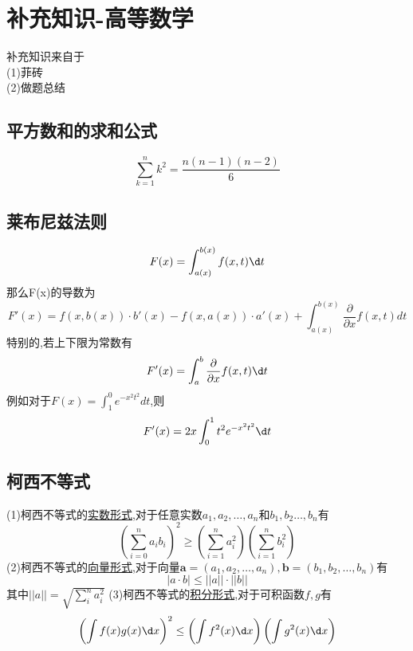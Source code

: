 \documentclass[12pt, a4paper, oneside, UTF8]{ctexbook}
\begin{document}

\else
\fi
\chapter {补充知识-高等数学}

\begin{tcolorbox}
    补充知识来自于 \\
    (1)菲砖 \\
    (2)做题总结
\end{tcolorbox}
\section{平方数和的求和公式}
\[
\sum_{k=1}^{n}k^2=\frac{n(n-1)(n-2)}{6}
\]
\section{莱布尼兹法则}
\[
F(x)=\int_{a(x)}^{b(x)}f(x,t)\d t 
\]
那么F(x)的导数为 
\[
F'(x) = f(x, b(x)) \cdot b'(x) - f(x, a(x)) \cdot a'(x) + \int_{a(x)}^{b(x)} \frac{\partial}{\partial x} f(x, t) dt
\]
特别的,若上下限为常数有 
\[
F'(x) = \int_{a}^{b}\frac{\partial}{\partial x}f(x,t)\d t
\]
例如对于$F(x)=\int_{1}^{0}e^{-x^2t^2}dt$,则 
\[
F'(x)=2x\int_{0}^{1}t^2e^{-x^2t^2}\d t
\]

\section{柯西不等式}
(1)柯西不等式的\underline{实数形式},对于任意实数$a_1,a_2,\ldots,a_n$和$b_1,b_2\ldots,b_n$有
$$
\left(\sum_{i=0}^{n}a_ib_i\right)^2\geq\left(\sum_{i=1}^{n}a_i^2\right)\left(\sum_{i=1}^{n}b_i^2\right)
$$
(2)柯西不等式的\underline{向量形式},对于向量$\textbf{a}=(a_1,a_2,\ldots,a_n),\textbf{b}=(b_1,b_2,\ldots,b_n)$有
$$
\left|a\cdot b\right|\leq \left|\left|a\right|\right|\cdot\left|\left|b\right|\right|
$$
其中$\displaystyle \left|\left|a\right|\right|=\sqrt{\sum_{i}^{n}a^2_i}$
(3)柯西不等式的\underline{积分形式},对于可积函数$f,g$有
$$
\left(\int f(x)g(x)\d x\right)^2\leq\left(\int f^2(x)\d x\right)\left(\int g^2(x)\d x\right)
$$
\ifx\allfiles\undefined
\end{document}
